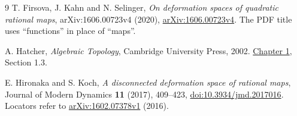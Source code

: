 \documentclass[11pt]{article}
\theoremstyle{remark}
\begin{document}
\begin{thebibliography}{9}
T. Firsova, J. Kahn and N. Selinger,
\emph{On deformation spaces of quadratic rational maps},
arXiv:1606.00723v4 (2020),
\href{https://arxiv.org/abs/1606.00723v4}{arXiv:1606.00723v4}.
The PDF title uses ``functions'' in place of ``maps''.

A. Hatcher, \emph{Algebraic Topology}, Cambridge University Press, 2002.
\href{https://pi.math.cornell.edu/~hatcher/AT/ATch1.pdf}{Chapter 1}, Section 1.3.

E. Hironaka and S. Koch,
\emph{A disconnected deformation space of rational maps},
Journal of Modern Dynamics \textbf{11} (2017), 409--423,
\href{https://doi.org/10.3934/jmd.2017016}{doi:10.3934/jmd.2017016}.
Locators refer to \href{https://arxiv.org/abs/1602.07378v1}{arXiv:1602.07378v1} (2016).
\end{thebibliography}
\end{document}
